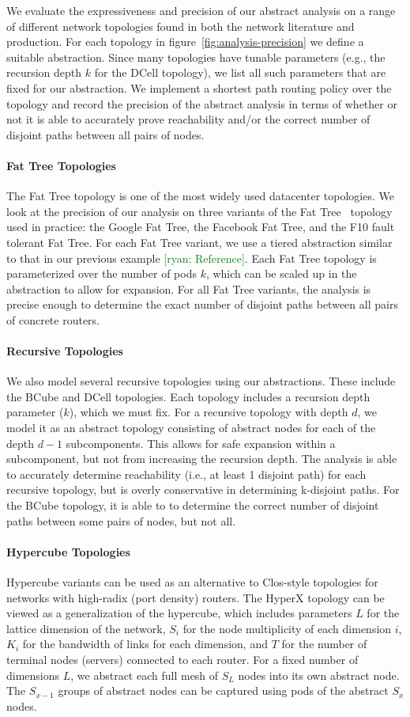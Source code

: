 \documentclass{sig-alternate-10pt}
\newcommand{\ryan}[1]{\textcolor{green}{[ryan: #1]}}
\newcommand{\para}[1]{\paragraph*{\textbf{#1}}}
\begin{document}
We evaluate the expressiveness and precision of our abstract analysis on a range of different network topologies found in both the network literature and production. For each topology in figure~\ref{fig:analysis-precision} we define a suitable abstraction. Since many topologies have tunable parameters (e.g., the recursion depth $k$ for the DCell topology), we list all such parameters that are fixed for our abstraction. We implement a shortest path routing policy over the topology and record the precision of the abstract analysis in terms of whether or not it is able to accurately prove reachability and/or the correct number of disjoint paths between all pairs of nodes.

\para{Fat Tree Topologies}

The Fat Tree topology is one of the most widely used datacenter topologies. We look at the precision of our analysis on three variants of the Fat Tree~\cite{foo} topology used in practice: the Google Fat Tree, the Facebook Fat Tree, and the F10 fault tolerant Fat Tree. For each Fat Tree variant, we use a tiered abstraction similar to that in our previous example \ryan{Reference}. Each Fat Tree topology is parameterized over the number of pods $k$, which can be scaled up in the abstraction to allow for expansion. For all Fat Tree variants, the analysis is precise enough to determine the exact number of disjoint paths between all pairs of concrete routers.

\para{Recursive Topologies}

We also model several recursive topologies using our abstractions. These include the BCube and DCell topologies. Each topology includes a recursion depth parameter ($k$), which we must fix. For a recursive topology with depth $d$, we model it as an abstract topology consisting of abstract nodes for each of the depth $d-1$ subcomponents. This allows for safe expansion within a subcomponent, but not from increasing the recursion depth. The analysis is able to accurately determine reachability (i.e., at least 1 disjoint path) for each recursive topology, but is overly conservative in determining k-disjoint paths. For the BCube topology, it is able to to determine the correct number of disjoint paths between some pairs of nodes, but not all.

\para{Hypercube Topologies}

Hypercube variants can be used as an alternative to Clos-style topologies for networks with high-radix (port density) routers. The HyperX topology can be viewed as a generalization of the hypercube, which includes parameters $L$ for the lattice dimension of the network, $S_i$ for the node multiplicity of each dimension $i$, $K_i$ for the bandwidth of links for each dimension, and $T$ for the number of terminal nodes (servers) connected to each router. For a fixed number of dimensions $L$, we abstract each full mesh of $S_L$ nodes into its own abstract node. The $S_{x-1}$ groups of abstract nodes can be captured using pods of the abstract $S_x$ nodes.
\end{document}
